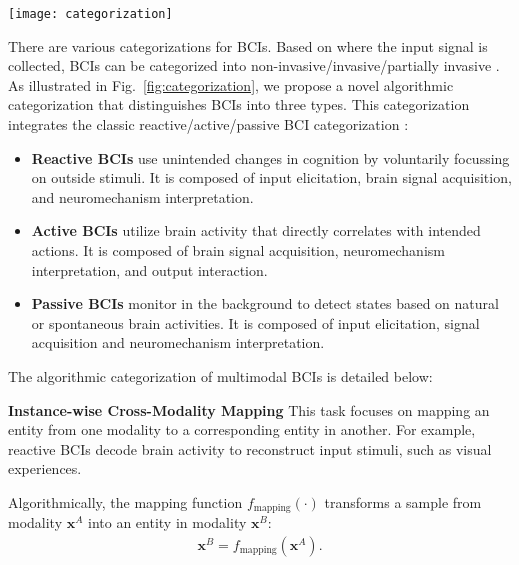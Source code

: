 \documentclass[journal]{IEEEtran}
\begin{document}
\begin{figure*}[htpb] \centering
\texttt{[image: categorization]}
\caption{Three types of multimodal BCIs and their representative applications. Reactive BCIs involve brain activities stimulated by designed inputs, such as visual decoding, where perceived images are decoded instance-wise. Active BCIs facilitate user-driven communication in sequential forms, such as speech decoding. Passive BCIs record brain activities using various sensors for tasks like affective BCIs. The core mechanisms involved are very distinct in the aspect of AI decoding algorithms for such three types.} \label{fig:categorization}
\end{figure*}

There are various categorizations for BCIs. Based on where the input signal is collected, BCIs can be categorized into non-invasive/invasive/partially invasive \cite{Rao2013}. As illustrated in Fig.~\ref{fig:categorization}, we propose a novel algorithmic categorization that distinguishes BCIs into three types. This categorization integrates the classic reactive/active/passive BCI categorization \cite{Zander2009, Guerkoek2012}:
\begin{itemize}
\item \textbf{Reactive BCIs} use unintended changes in cognition by voluntarily focussing on outside stimuli. It is composed of input elicitation, brain signal acquisition, and neuromechanism interpretation.
\item \textbf{Active BCIs} utilize brain activity that directly correlates with intended actions. It is composed of brain signal acquisition, neuromechanism interpretation, and output interaction.
\item \textbf{Passive BCIs} monitor in the background to detect states based on natural or spontaneous brain activities. It is composed of input elicitation, signal acquisition and neuromechanism interpretation.
\end{itemize}

The algorithmic categorization of multimodal BCIs is detailed below:

\textbf{Instance-wise Cross-Modality Mapping} This task focuses on mapping an entity from one modality to a corresponding entity in another. For example, reactive BCIs decode brain activity to reconstruct input stimuli, such as visual experiences.

Algorithmically, the mapping function $f_{\text{mapping}}(\cdot)$ transforms a sample from modality $\mathbf{x}^{A}$ into an entity in modality $\mathbf{x}^{B}$:
\begin{align}
\mathbf{x}^{B} = f_{\text{mapping}}(\mathbf{x}^{A}).
\end{align}
\end{document}
